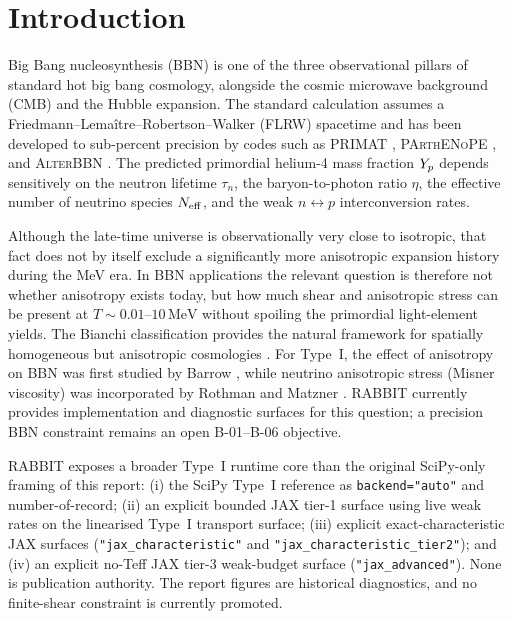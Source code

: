 \section{Introduction}\label{sec:intro}

Big Bang nucleosynthesis (BBN) is one of the three observational pillars of standard hot big bang cosmology, alongside the cosmic microwave background (CMB) and the Hubble expansion.  The standard calculation assumes a Friedmann--Lema\^itre--Robertson--Walker (FLRW) spacetime and has been developed to sub-percent precision by codes such as PRIMAT \cite{PitrouPRIMAT2021}, \textsc{PArthENoPE} \cite{PArthENoPE2018}, and \textsc{AlterBBN} \cite{AlterBBN2020}.  The predicted primordial helium-4 mass fraction $Y_p$ depends sensitively on the neutron lifetime $\tau_n$, the baryon-to-photon ratio $\eta$, the effective number of neutrino species $N_{\rm eff}$, and the weak $n \leftrightarrow p$ interconversion rates.

Although the late-time universe is observationally very close to isotropic, that fact does not by itself exclude a significantly more anisotropic expansion history during the MeV era.  In BBN applications the relevant question is therefore not whether anisotropy exists today, but how much shear and anisotropic stress can be present at $T \sim 0.01$--$10\,\mathrm{MeV}$ without spoiling the primordial light-element yields.  The Bianchi classification provides the natural framework for spatially homogeneous but anisotropic cosmologies \cite{WainwrightEllis1997}.  For Type~I, the effect of anisotropy on BBN was first studied by Barrow \cite{Barrow1976}, while neutrino anisotropic stress (Misner viscosity) was incorporated by Rothman and Matzner \cite{RothmanMatzner1982}.  RABBIT currently provides implementation and diagnostic surfaces for this question; a precision BBN constraint remains an open B-01--B-06 objective.

RABBIT exposes a broader Type~I runtime core than the original SciPy-only framing of this report: (i) the SciPy Type~I reference as \texttt{backend="auto"} and number-of-record; (ii) an explicit bounded JAX tier-1 surface using live weak rates on the linearised Type~I transport surface; (iii) explicit exact-characteristic JAX surfaces (\texttt{"jax\_characteristic"} and \texttt{"jax\_characteristic\_tier2"}); and (iv) an explicit no-Teff JAX tier-3 weak-budget surface (\texttt{"jax\_advanced"}).  None is publication authority.  The report figures are historical diagnostics, and no finite-shear constraint is currently promoted.

